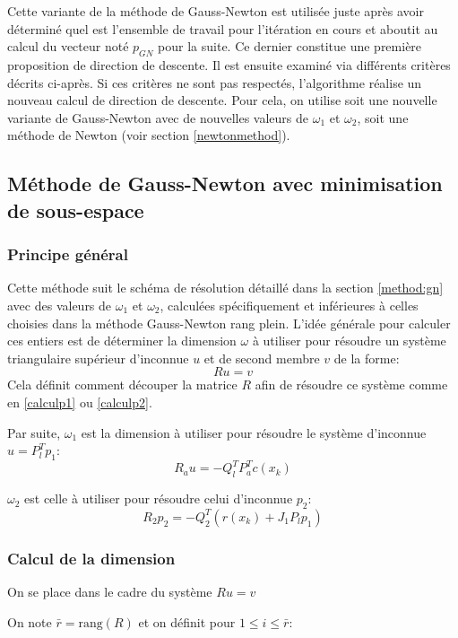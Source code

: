 \documentclass[a4paper,11pt]{article}
\numberwithin{equation}{section}
\begin{document}
Cette variante de la méthode de Gauss-Newton est utilisée juste après avoir déterminé quel est l'ensemble de travail pour l'itération en cours et aboutit au calcul du vecteur noté $p_{GN}$ pour la suite. Ce dernier constitue une première proposition de direction de descente. Il est ensuite examiné via différents critères décrits ci-après. Si ces critères ne sont pas respectés, l'algorithme réalise un nouveau calcul de direction de descente. Pour cela, on utilise soit une nouvelle variante de Gauss-Newton avec de nouvelles valeurs de $\omega_{1}$ et $\omega_{2}$, soit une méthode de Newton (voir section \ref{newtonmethod}).

\subsection{Méthode de Gauss-Newton avec minimisation de sous-espace} \label{subspace}

\subsubsection{Principe général}


Cette méthode suit le schéma de résolution détaillé dans la section \ref{method:gn} avec des valeurs de $\omega_{1}$ et $\omega_{2}$, calculées spécifiquement et inférieures à celles choisies dans la méthode Gauss-Newton rang plein. L'idée générale pour calculer ces entiers est de déterminer la dimension $\omega$ à utiliser pour résoudre un système triangulaire supérieur d'inconnue $u$ et de second membre $v$ de la forme: 
\begin{equation} \label{systsubdim}
Ru=v
\end{equation}
Cela définit comment découper la matrice $R$ afin de résoudre ce système comme en \ref{calculp1} ou \ref{calculp2}.

Par suite, $\omega_{1}$ est la dimension à utiliser pour résoudre le système d'inconnue $u=P_l^{T}p_1$: $$R_{a}u = -Q_l^TP_{a}^Tc(x_{k})$$

 $\omega_{2}$ est celle à utiliser pour résoudre celui d'inconnue $p_{2}$: $$R_{2}p_2 = -Q_2^T(r(x_{k}) + J_1P_lp_1)$$ 
 
 \subsubsection{Calcul de la dimension}
 
 On se place dans le cadre du système $Ru=v$
 
 On note $\bar{r}=\text{rang}(R)$ et on définit pour $1\leq i \leq \bar{r}$:
\newcommand{\ws}{workset}
 
\end{document}
